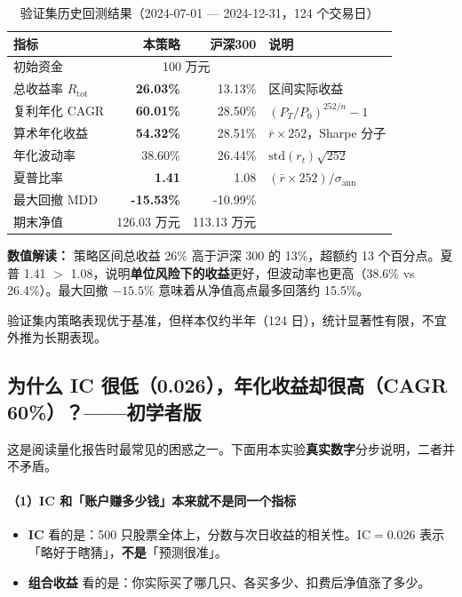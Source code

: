 \documentclass[UTF8,a4paper,12pt]{ctexart}
\begin{document}
\begin{table}[H]
\centering
\caption{验证集历史回测结果（2024-07-01 --- 2024-12-31，124 个交易日）}
\label{tab:backtest}
\begin{tabular}{lrrl}
\toprule
\textbf{指标} & \textbf{本策略} & \textbf{沪深300} & \textbf{说明} \\
\midrule
初始资金     & \multicolumn{2}{c}{100 万元} & \\
总收益率 $R_{\mathrm{tot}}$     & \textbf{26.03\%} & 13.13\% & 区间实际收益 \\
复利年化 CAGR  & \textbf{60.01\%} & 28.50\% & $(P_T/P_0)^{252/n}-1$ \\
算术年化收益   & \textbf{54.32\%} & 28.51\% & $\bar{r}\times 252$，Sharpe 分子 \\
年化波动率     & 38.60\% & 26.44\% & $\mathrm{std}(r_t)\sqrt{252}$ \\
夏普比率       & \textbf{1.41} & 1.08 & $(\bar{r}\times 252)/\sigma_{\mathrm{ann}}$ \\
最大回撤 MDD   & \textbf{-15.53\%} & -10.99\% & \\
期末净值       & 126.03 万元 & 113.13 万元 & \\
\bottomrule
\end{tabular}
\end{table}

\textbf{数值解读：} 策略区间总收益 26\% 高于沪深 300 的 13\%，超额约 13 个百分点。夏普 1.41 $>$ 1.08，说明\textbf{单位风险下的收益}更好，但波动率也更高（38.6\% vs 26.4\%）。最大回撤 $-15.5\%$ 意味着从净值高点最多回落约 15.5\%。

验证集内策略表现优于基准，但样本仅约半年（124 日），统计显著性有限，不宜外推为长期表现。

\subsection{为什么 IC 很低（0.026），年化收益却很高（CAGR 60\%）？——初学者版}

这是阅读量化报告时最常见的困惑之一。下面用本实验\textbf{真实数字}分步说明，二者并不矛盾。

\paragraph{（1）IC 和「账户赚多少钱」本来就不是同一个指标}

\begin{itemize}[leftmargin=2em]
  \item \textbf{IC} 看的是：500 只股票全体上，分数与次日收益的相关性。IC$=0.026$ 表示「略好于瞎猜」，\textbf{不是}「预测很准」。
  \item \textbf{组合收益} 看的是：你实际买了哪几只、各买多少、扣费后净值涨了多少。
\end{itemize}
\end{document}

